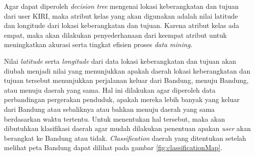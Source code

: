 \begin{center}
\begin{table}
\rotatebox{90}{%
\begin{tabular}{|l|l|l|l|p{2.5cm}|p{2.5cm}|p{2.5cm}|p{2.5cm}|}
\hline
\textbf{Bulan}	& \textbf{Tahun} 	& \textbf{Hari} & \textbf{Jam} & \textbf{Latitude Keberangkatan} & \textbf{Longitude Keberangkatan} & \textbf{Latitude Tujuan} & \textbf{Longitude Tujuan}      \\ \hline
02								& 2014						& Sabtu         & 07						 & -6.8972513										 & 107.6185574 							  & -6.91358                & 107.62718 \\ \hline
02								& 2014						& Sabtu         & 07						 & -6.8972513										 & 107.6385574                & -6.91358							  & 107.62718 \\ \hline
02								& 2014						& Sabtu         & 07 						 & -6.90598											 & 107.59714     		  				& -6.90855						&107.61082 \\ \hline
02								& 2014						& Sabtu         & 07  					 & -6.9015366										 & 107.5414474 								& -6.88574					    & 107.53816 \\ \hline
02								& 2014						& Sabtu         & 07 						 & -6.90608										   & 107.61530     						  & -6.89140					 &107.61060 \\ \hline
02								& 2014						& Sabtu         & 07 						 & -6.89459											 & 107.58818     							& -6.89876						&107.60886 \\ \hline
02								& 2014						& Sabtu         & 07 						 & -6.89459											 &107.58818  								   & -6.86031					 &107.61287 \\ \hline
\end{tabular}%
}
\caption{Contoh hasil data transformasi}
\label{table:contohHasilDataTransformasi}
\end{table}
\end{center}
Agar dapat diperoleh \textsl{decision tree} mengenai lokasi keberangkatan dan tujuan dari user KIRI, maka atribut kelas yang akan digunakan adalah nilai latitude dan longitude dari lokasi keberangkatan dan tujuan. Karena atribut kelas ada empat, maka akan dilakukan penyederhanaan dari keempat atribut untuk meningkatkan akurasi serta tingkat efisien proses \textsl{data mining}. 

Nilai \textsl{latitude} serta \textsl{longitude} dari data lokasi keberangkatan dan tujuan akan diubah menjadi nilai yang menunjukkan apakah daerah lokasi keberangkatan dan tujuan tersebut menunjukkan perjalanan keluar dari Bandung, menuju Bandung, atau menuju daerah yang sama. Hal ini dilakukan agar diperoleh data perbandingan pergerakan penduduk, apakah mereka lebih banyak yang keluar dari Bandung atau sebaliknya atau bahkan menuju daerah yang sama berdasarkan waktu tertentu. Untuk menentukan hal tersebut, maka akan dibutuhkan klasifikasi daerah agar mudah dilakukan penentuan apakan \textsl{user} akan berangkat ke Bandung atau tidak. \textsl{Classification} daerah yang ditentukan setelah melihat peta Bandung dapat dilihat pada gambar \ref{fig:classificationMap}.

